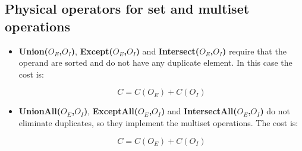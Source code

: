 \subsection{Physical operators for set and multiset operations}

\begin{itemize}
    \item \textbf{Union($O_E$,$O_I$)}, \textbf{Except($O_E$,$O_I$)} and \textbf{Intersect($O_E$,$O_I$)} require that the operand are sorted and do not have any duplicate element. In this case the cost is:

    $$
    C = C(O_E) + C(O_I)
    $$

    \item \textbf{UnionAll($O_E$,$O_I$)}, \textbf{ExceptAll($O_E$,$O_I$)} and \textbf{IntersectAll($O_E$,$O_I$)} do not eliminate duplicates, so they implement the multiset operations. The cost is:

    $$
    C = C(O_E) + C(O_I)
    $$
    
\end{itemize}